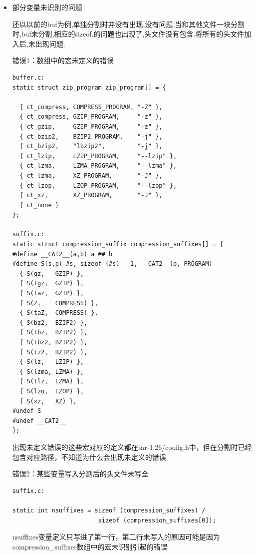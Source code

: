 \begin{itemize}
\item{部分变量未识别的问题}
\par{还以以前的buf为例,单独分割时并没有出现,没有问题,当和其他文件一块分割时,buf未分割,相应的sizeof.的问题也出现了,头文件没有包含.将所有的头文件加入后,未出现问题.}

\par{错误1：数组中的宏未定义的错误}
\begin{lstlisting}
buffer.c:
static struct zip_program zip_program[] = {

  { ct_compress, COMPRESS_PROGRAM, "-Z" },
  { ct_compress, GZIP_PROGRAM,     "-z" },
  { ct_gzip,     GZIP_PROGRAM,     "-z" },
  { ct_bzip2,    BZIP2_PROGRAM,    "-j" },
  { ct_bzip2,    "lbzip2",         "-j" },
  { ct_lzip,     LZIP_PROGRAM,     "--lzip" },
  { ct_lzma,     LZMA_PROGRAM,     "--lzma" },
  { ct_lzma,     XZ_PROGRAM,       "-J" },
  { ct_lzop,     LZOP_PROGRAM,     "--lzop" },
  { ct_xz,       XZ_PROGRAM,       "-J" },
  { ct_none }
};

suffix.c:
static struct compression_suffix compression_suffixes[] = {
#define __CAT2__(a,b) a ## b
#define S(s,p) #s, sizeof (#s) - 1, __CAT2__(p,_PROGRAM)
  { S(gz,   GZIP) },
  { S(tgz,  GZIP) },
  { S(taz,  GZIP) },
  { S(Z,    COMPRESS) },
  { S(taZ,  COMPRESS) },
  { S(bz2,  BZIP2) },
  { S(tbz,  BZIP2) },
  { S(tbz2, BZIP2) },
  { S(tz2,  BZIP2) },
  { S(lz,   LZIP) },
  { S(lzma, LZMA) },
  { S(tlz,  LZMA) },
  { S(lzo,  LZOP) },
  { S(xz,   XZ) },
#undef S
#undef __CAT2__
};

\end{lstlisting}
\par{出现未定义错误的这些宏对应的定义都在tar-1.26/config.h中，但在分割时已经包含对应路径，不知道为什么会出现未定义的错误}
\par{错误2：某些变量写入分割后的头文件未写全}

\begin{lstlisting}
suffix.c:

static int nsuffixes = sizeof (compression_suffixes) /
                        sizeof (compression_suffixes[0]);

\end{lstlisting}
\par{nsuffixes变量定义只写进了第一行，第二行未写入的原因可能是因为compression\_suffixes数组中的宏未识别引起的错误}
\end{itemize}
